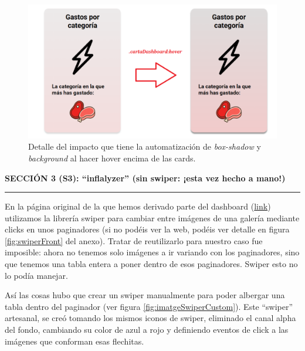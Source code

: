 \documentclass[a4paper,12pt]{report}
\begin{document}
		\FloatBarrier
	\begin{figure}[H]
		\centering
		\caption{Detalle del impacto que tiene la automatización de \textit{box-shadow} y \textit{background} al hacer hover encima de las cards.}
		\label{fig:cardCaracteristicaAbansDespres}
		\includegraphics[width=1\linewidth]{img/cardCaracteristicaAbansDespres.png}
	\end{figure}
	\FloatBarrier
	
	
	
	\noindent \textbf{SECCIÓN 3 (S3): ``inflalyzer'' (sin swiper: ¡esta vez hecho a mano!) }
	\hrule
	\vspace{.5em}
	En la página original de la que hemos derivado parte del dashboard (\href{https://blackcub3s.github.io/proyectoDesarrolloInterfaces/FrontEnd.html}{link}) utilizamos la librería swiper para cambiar entre imágenes de una galería mediante clicks en unos paginadores (si no podéis ver la web, podéis ver detalle en figura \ref{fig:swiperFront} del anexo). Tratar de reutilizarlo para nuestro caso fue imposible: ahora no tenemos solo imágenes a ir variando con los paginadores, sino que tenemos una tabla entera a poner dentro de esos paginadores. Swiper esto no lo podía manejar.
	
	Así las cosas hubo que crear un swiper manualmente para poder albergar una tabla dentro del paginador (ver figura \ref{fig:imatgeSwiperCustom}). Este ``swiper'' artesanal, se creó tomando los mismos iconos de swiper, eliminado el canal alpha del fondo, cambiando su color de azul a rojo y definiendo eventos de click a las imágenes que conforman esas flechitas.
	
\end{document}
